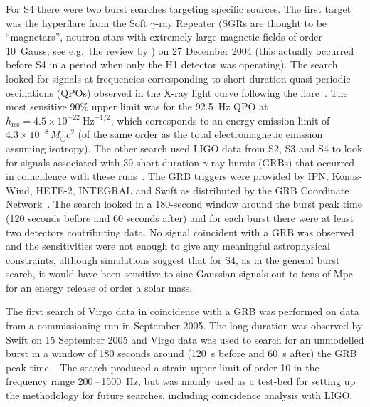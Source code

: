 For S4 there were two burst searches targeting specific sources. The first target was the hyperflare from the 
Soft $\gamma$-ray Repeater  (SGRs are thought to be ``magnetars'', neutron stars 
with extremely large magnetic fields of order 10~Gauss, see e.g.\ the review by 
\cite{Mereghetti2008}) on 27 December 2004 \cite{Hurley:2005} (this actually occurred before S4 in a period 
when only the H1 detector was operating). The search looked for signals at frequencies corresponding to short 
duration quasi-periodic oscillations (QPOs) observed in the X-ray light curve following the 
flare~\cite{Abbott:2007c}. The most sensitive 90\% upper limit was for the 92.5~Hz QPO at $h_{\mathrm{rss}} =
4.5\times10^{-22} \mathrm{\ Hz}^{-1/2}$, which corresponds to an energy emission limit
of $4.3\times10^{-8}\,M_{\odot}c^2$ (of the same order as the total electromagnetic emission assuming 
isotropy). The other search used LIGO data from S2, S3 and S4 to look for signals associated with 39 short 
duration $\gamma$-ray bursts (GRBs) that occurred in coincidence with these runs~\cite{Abbott:2008c}. The GRB 
triggers were provided by IPN, Konus-Wind, HETE-2, INTEGRAL and Swift as distributed by the GRB
Coordinate Network~\cite{GCN}. The search looked in a 180-second window around the burst peak time (120 
seconds before and 60 seconds after) and for each burst there were at least two detectors
contributing data. No signal coincident with a GRB was observed and the sensitivities were not enough to give 
any meaningful astrophysical constraints, although simulations suggest that for S4, as in the general burst
search, it would have been sensitive to sine-Gaussian signals out to tens of Mpc for an energy release of 
order a solar mass.

The first search of Virgo data in coincidence with a GRB was performed on data from a commissioning run in 
September 2005. The long duration  was observed by Swift on 15 September 2005 and 
Virgo data was used to search for an unmodelled burst in a window of 180 seconds around (120~s before and 
60~s after) the GRB peak time~\cite{Acernese:2008a}. The search produced a strain upper limit of order 
10 in the frequency range 200\,--\,1500~Hz, but was mainly used as a test-bed for setting up the 
methodology for future searches, including coincidence analysis with LIGO.

